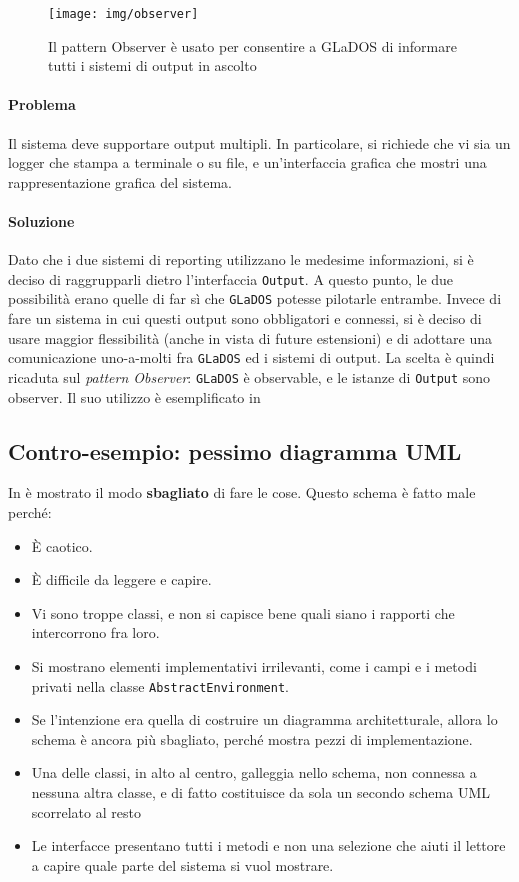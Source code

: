 \documentclass[a4paper,12pt]{report}
\begin{document}
\begin{figure}[H]
\centering{}
\texttt{[image: img/observer]}
\caption{Il pattern Observer è usato per consentire a GLaDOS di informare tutti i sistemi di output in ascolto}
\label{img:observer}
\end{figure}

\paragraph{Problema} Il sistema deve supportare output multipli. In particolare, si richiede che vi sia un logger che stampa a terminale o su file,
e un'interfaccia grafica che mostri una rappresentazione grafica del sistema.

\paragraph{Soluzione} Dato che i due sistemi di reporting utilizzano le medesime informazioni, si è deciso di raggrupparli dietro l'interfaccia \texttt{Output}.
A questo punto, le due possibilità erano quelle di far sì che \texttt{GLaDOS} potesse pilotarle entrambe.
Invece di fare un sistema in cui questi output sono obbligatori e connessi, si è deciso di usare maggior flessibilità (anche in vista di future estensioni)
e di adottare una comunicazione uno-a-molti fra \texttt{GLaDOS} ed i sistemi di output.
La scelta è quindi ricaduta sul \textit{pattern Observer}: \texttt{GLaDOS} è observable, e le istanze di \texttt{Output} sono observer.
%
Il suo utilizzo è esemplificato in 


\subsection*{Contro-esempio: pessimo diagramma UML}

In  è mostrato il modo \textbf{sbagliato} di fare le cose.
%
Questo schema è fatto male perché:
\begin{itemize}
	\item È caotico.
	\item È difficile da leggere e capire.
	\item Vi sono troppe classi, e non si capisce bene quali siano i rapporti che intercorrono fra loro.
	\item Si mostrano elementi implementativi irrilevanti, come i campi e i metodi privati nella classe \texttt{AbstractEnvironment}.
	\item Se l'intenzione era quella di costruire un diagramma architetturale, allora lo schema è ancora più sbagliato, perché mostra pezzi di implementazione.
	\item Una delle classi, in alto al centro, galleggia nello schema, non connessa a nessuna altra classe, e di fatto costituisce da sola un secondo schema UML scorrelato al resto
	\item Le interfacce presentano tutti i metodi e non una selezione che aiuti il lettore a capire quale parte del sistema si vuol mostrare.
\end{itemize}
\end{document}
